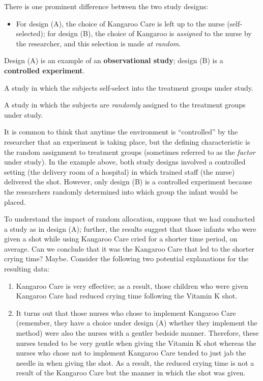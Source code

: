 \documentclass[]{book}
\providecommand{\tightlist}{%
  \setlength{\itemsep}{0pt}\setlength{\parskip}{0pt}}
\theoremstyle{definition}
\theoremstyle{definition}
\theoremstyle{remark}
\let\BeginKnitrBlock\begin \let\EndKnitrBlock\end
\begin{document}
There is one prominent difference between the two study designs:

\begin{itemize}
\tightlist
\item
  For design (A), the choice of Kangaroo Care is left up to the nurse
  (self-selected); for design (B), the choice of Kangaroo is
  \emph{assigned} to the nurse by the researcher, and this selection is
  made \emph{at random}.
\end{itemize}

Design (A) is an example of an \textbf{observational study}; design (B)
is a \textbf{controlled experiment}.

\BeginKnitrBlock{definition}[Observational Study]
\protect\hypertarget{def:defn-observational-study}{}{\label{def:defn-observational-study}
{} }A study in which the subjects
self-select into the treatment groups under study.
\EndKnitrBlock{definition}

\BeginKnitrBlock{definition}[Controlled Experiment]
\protect\hypertarget{def:defn-controlled-experiment}{}{\label{def:defn-controlled-experiment}
{} }A study in which the subjects
are \emph{randomly} assigned to the treatment groups under study.
\EndKnitrBlock{definition}

It is common to think that anytime the environment is ``controlled'' by
the researcher that an experiment is taking place, but the defining
characteristic is the random assignment to treatment groups (sometimes
referred to as the \emph{factor} under study). In the example above,
both study designs involved a controlled setting (the delivery room of a
hospital) in which trained staff (the nurse) delivered the shot.
However, only design (B) is a controlled experiment because the
researchers randomly determined into which group the infant would be
placed.

To understand the impact of random allocation, suppose that we had
conducted a study as in design (A); further, the results suggest that
those infants who were given a shot while using Kangaroo Care cried for
a shorter time period, on average. Can we conclude that it was the
Kangaroo Care that led to the shorter crying time? Maybe. Consider the
following two potential explanations for the resulting data:

\begin{enumerate}
\def\labelenumi{(\arabic{enumi})}
\tightlist
\item
  Kangaroo Care is very effective; as a result, those children who were
  given Kangaroo Care had reduced crying time following the Vitamin K
  shot.
\item
  It turns out that those nurses who chose to implement Kangaroo Care
  (remember, they have a choice under design (A) whether they implement
  the method) were also the nurses with a gentler bedside manner.
  Therefore, these nurses tended to be very gentle when giving the
  Vitamin K shot whereas the nurses who chose not to implement Kangaroo
  Care tended to just jab the needle in when giving the shot. As a
  result, the reduced crying time is not a result of the Kangaroo Care
  but the manner in which the shot was given.
\end{enumerate}
\end{document}
